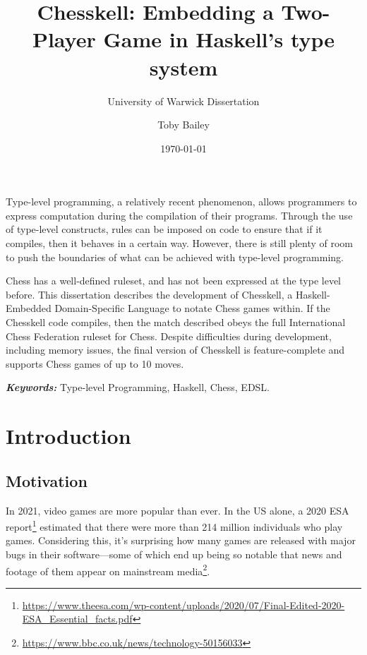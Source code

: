 \documentclass[12pt, a4paper, bibliography=totocnumbered]{scrreprt}
\title{Chesskell: Embedding a Two-Player Game in Haskell's type system}
\subtitle{University of Warwick Dissertation}
\author{Toby Bailey}
\date{\today}
\renewenvironment{abstract}
 {\small
  \begin{center}
  \bfseries \textit{\abstractname}\vspace{-.5em}\vspace{0pt}
  \end{center}
  \quotation}
 {\endquotation}
\begin{document}
{
\renewcommand{\normalfont}{\usekomafont{sectioning}}
\begin{titlepage}
    \maketitle
\end{titlepage}
}

\begin{abstract}
    Type-level programming, a relatively recent phenomenon, allows programmers to express computation during the compilation of their programs. Through the use of type-level constructs, rules can be imposed on code to ensure that if it compiles, then it behaves in a certain way. However, there is still plenty of room to push the boundaries of what can be achieved with type-level programming.

    Chess has a well-defined ruleset, and has not been expressed at the type level before. This dissertation describes the development of Chesskell, a Haskell-Embedded Domain-Specific Language to notate Chess games within. If the Chesskell code compiles, then the match described obeys the full International Chess Federation ruleset for Chess. Despite difficulties during development, including memory issues, the final version of Chesskell is feature-complete and supports Chess games of up to 10 moves.

    \textbf{\textit{Keywords:}} Type-level Programming, Haskell, Chess, EDSL.
\end{abstract}

\part{Introduction}

\chapter{Motivation}

In 2021, video games are more popular than ever. In the US alone, a 2020 ESA report\footnote{\url{https://www.theesa.com/wp-content/uploads/2020/07/Final-Edited-2020-ESA_Essential_facts.pdf}} estimated that there were more than 214 million individuals who play games. Considering this, it's surprising how many games are released with major bugs in their software---some of which end up being so notable that news and footage of them appear on mainstream media\footnote{\url{https://www.bbc.co.uk/news/technology-50156033}}.
\end{document}
